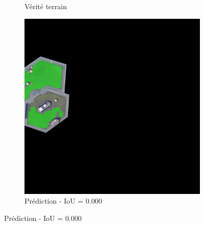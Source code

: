 \begin{figure}[H]
\begin{subfigure}{0.32\textwidth}
    \caption{Vérité terrain}
\end{subfigure}
\hfill
\begin{subfigure}{0.32\textwidth}
    \includegraphics[width=\textwidth]{02-main//figures/ch4/kfold_ensembles/segformer_tu-mambaout_base/worst_cases/worst_5_iou0.000_25001117_tile_3_9_5ba8f7_overlay_pred.png}
    \caption{Prédiction - IoU = 0.000}
\end{subfigure}

\vspace{0.35cm}


\end{figure}

